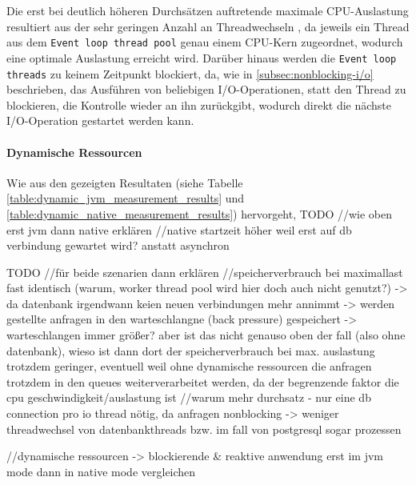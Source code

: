 Die erst bei deutlich höheren Durchsätzen auftretende maximale CPU-Auslastung resultiert aus der sehr geringen Anzahl an Threadwechseln
, da jeweils ein Thread aus dem \verb|Event loop thread pool| genau einem CPU-Kern zugeordnet, wodurch eine optimale Auslastung erreicht
wird. Darüber hinaus werden die \verb|Event loop threads| zu keinem Zeitpunkt blockiert, da, wie in \ref{subsec:nonblocking-i/o}
beschrieben, das Ausführen von beliebigen I/O-Operationen, statt den Thread zu blockieren, die Kontrolle wieder an ihn zurückgibt,
wodurch direkt die nächste I/O-Operation gestartet werden kann.

\paragraph{Dynamische Ressourcen}
Wie aus den gezeigten Resultaten (siehe Tabelle \ref{table:dynamic_jvm_measurement_results} und
\ref{table:dynamic_native_measurement_results}) hervorgeht,
TODO
//wie oben erst jvm dann native erklären
//native startzeit höher weil erst auf db verbindung gewartet wird? anstatt asynchron

TODO
//für beide szenarien dann erklären
//speicherverbrauch bei maximallast fast identisch (warum, worker thread pool wird hier doch auch nicht genutzt?)
-> da datenbank irgendwann keien neuen verbindungen mehr annimmt -> werden gestellte anfragen in den warteschlangne (back pressure)
gespeichert -> warteschlangen immer größer? aber ist das nicht genauso oben der fall (also ohne datenbank), wieso ist dann
dort der speicherverbrauch bei max. auslastung trotzdem geringer, eventuell weil ohne dynamische ressourcen die anfragen
trotzdem in den queues weiterverarbeitet werden, da der begrenzende faktor die cpu geschwindigkeit/auslastung ist
//warum mehr durchsatz - nur eine db connection pro io thread nötig, da anfragen nonblocking -> weniger threadwechsel
von datenbankthreads bzw. im fall von postgresql sogar prozessen


//dynamische ressourcen -> blockierende \& reaktive anwendung erst im jvm mode dann in native mode vergleichen

